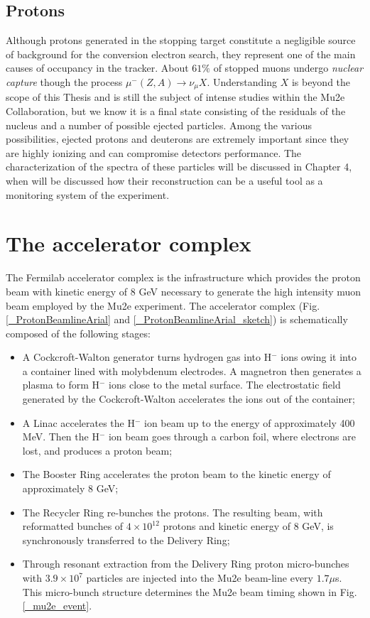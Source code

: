 \documentclass[12pt,a4paper,openright, oneside, titlepage]{book} %
\begin{document}
\subsection{Protons}
\label{backgrounds}
Although protons generated in the stopping target constitute a negligible source of background for the conversion electron search, they represent one of the main causes of occupancy in the tracker. About $61\%$ of stopped muons undergo \textit{nuclear capture} though the process $\mu^-(Z,A)\rightarrow \nu_\mu X$. 
Understanding $X$ is beyond the scope of this Thesis and is still the subject of intense studies within the Mu2e Collaboration, but we know it is a final state consisting of the residuals of the nucleus and a number of possible ejected particles. 
Among the various possibilities, ejected protons and deuterons are extremely important since they are highly ionizing and can compromise detectors performance. 
The characterization of the spectra of these particles will be discussed in Chapter 4, when will be discussed how their reconstruction can be a useful tool as a monitoring system of the experiment.


\section{The accelerator complex}
The Fermilab accelerator complex is the infrastructure which provides 
the proton beam with kinetic energy of 8 GeV necessary to generate 
the high intensity muon beam employed by the Mu2e experiment.
The accelerator complex 
(Fig. \ref{_ProtonBeamlineArial} and \ref{_ProtonBeamlineArial_sketch})
is schematically composed of the following stages:
\begin{itemize}
\item A Cockcroft-Walton generator turns hydrogen gas
into H$^-$ ions owing it into a container lined with molybdenum electrodes. 
A magnetron then generates a plasma to form H$^-$ ions close to the metal surface. 
The electrostatic field generated by the Cockcroft-Walton accelerates the ions out of the container;
\item A Linac accelerates the H$^-$ ion beam up to the energy of approximately 400 MeV. 
Then the H$^-$  ion beam goes through a carbon foil, 
where electrons are lost, and produces a proton beam;
\item The Booster Ring accelerates the proton beam to the kinetic energy of approximately 8 GeV;
\item The Recycler Ring re-bunches the protons. 
The resulting beam, with reformatted bunches of $4\times10^{12}$ protons 
and kinetic energy of 8 GeV,
is synchronously transferred to the Delivery Ring;
\item Through resonant extraction from the Delivery Ring proton micro-bunches
with $3.9\times10^7$ particles are injected into the Mu2e beam-line every $1.7 \mu$s. 
This  micro-bunch structure determines the Mu2e beam timing shown in Fig.  \ref{_mu2e_event}. 
\end{itemize}
\end{document}
